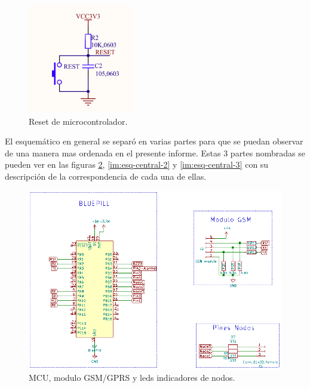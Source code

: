 \begin{figure}[!h]
	\centering
	\includegraphics[scale=0.6]{images/central/bluepill-reset.png}
    \caption{Reset de microcontrolador.}
	\label{im:reset-bluepill}
\end{figure}

\par El esquemático en general se separó en varias partes para que se puedan observar de una manera mas ordenada en el presente informe. Estas 3 partes nombradas se pueden ver en las figuras \ref{im:esq-central-1}, \ref{im:esq-central-2} y \ref{im:esq-central-3} con su descripción de la correspondencia de cada una de ellas. 

\begin{figure}[!h]
	\centering
	\includegraphics[scale=.50]{images/central/central-esq-1.png}
    \caption{MCU, modulo GSM/GPRS y leds indicadores de nodos.}
	\label{im:esq-central-1}
\end{figure}

